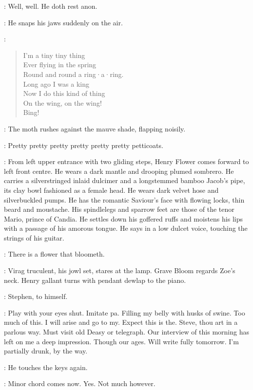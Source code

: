 \Virag:
Well,
well.
He doth rest anon.

:
He snaps his jaws suddenly on the air.

\Moth[2]:
\begin{verse}
    I'm a tiny tiny thing\\
%
    Ever flying in the spring\\
    Round and round a ring·a·ring.\\
    Long ago I was a king\\
    Now I do this kind of thing\\
    On the wing, on the wing!\\
    Bing!
\end{verse}

:
The moth rushes against the mauve shade,
flapping noisily.

\Moth:
Pretty pretty pretty pretty pretty pretty petticoats.

:
From left upper entrance with two gliding steps,
Henry Flower comes forward to left front centre.
He wears a dark mantle and drooping plumed sombrero.
He carries a silverstringed inlaid dulcimer and
a longstemmed bamboo Jacob's pipe,
its clay bowl fashioned as a female head.
He wears dark velvet hose and silverbuckled pumps.
He has the romantic Saviour's face with flowing locks,
thin beard and moustache.
His spindlelegs and sparrow feet are those of the tenor Mario,
prince of Candia.
He settles down his goffered ruffs
and moistens his lips with a passage of his amorous tongue.
He says in a low dulcet voice,
touching the strings of his guitar.

\Henry:
There is a flower that bloometh.%

:
Virag truculent,
his jowl set,
stares at the lamp.
Grave Bloom regards Zoe's neck.
Henry gallant turns with pendant dewlap to the piano.

:
Stephen,
to himself.

\Stephen:
Play with your eyes shut.
Imitate pa.
Filling my belly with husks of swine.
Too much of this.
I will arise and go to my.
Expect this is the.
Steve,
thou art in a parlous way.
Must visit old Deasy or telegraph.
Our interview of this morning has left on me a deep impression.
Though our ages.
Will write fully tomorrow.
I'm partially drunk,
by the way.

:
He touches the keys again.

\Stephen:
Minor chord comes now.
Yes.
Not much however.

